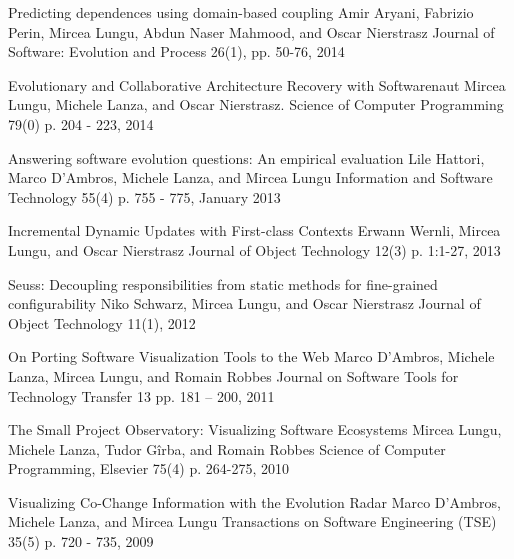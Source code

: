 
\begin{enumerate}

\paper
	{Predicting dependences using domain-based coupling}
	{Amir Aryani, Fabrizio Perin, Mircea Lungu, Abdun Naser Mahmood, and Oscar Nierstrasz}
	{Journal of Software: Evolution and Process 26(1), pp. 50-76, 2014}

\paper 
	{Evolutionary and Collaborative Architecture Recovery with Softwarenaut}
	{Mircea Lungu, Michele Lanza, and Oscar Nierstrasz.}
	{Science of Computer Programming 79(0) p. 204 - 223, 2014}

\paper 
	{Answering software evolution questions: An empirical evaluation}
	{Lile Hattori, Marco D'Ambros, Michele Lanza, and Mircea Lungu}
	{Information and Software Technology 55(4) p. 755 - 775, January 2013}

\paper 
	{Incremental Dynamic Updates with First-class Contexts}
	{Erwann Wernli, Mircea Lungu, and Oscar Nierstrasz}
	{Journal of Object Technology 12(3) p. 1:1-27, 2013}

\paper
	{Seuss: Decoupling responsibilities from static methods for fine-grained configurability}
	{Niko Schwarz, Mircea Lungu, and Oscar Nierstrasz}
	{Journal of Object Technology 11(1), 2012}

\paper 
	{On Porting Software Visualization Tools to the Web}
	{Marco D'Ambros, Michele Lanza, Mircea Lungu, and Romain Robbes}
	{Journal on Software Tools for Technology Transfer 13 pp. 181 -- 200, 2011}

\paper 
	{The Small Project Observatory: Visualizing Software Ecosystems}
	{Mircea Lungu, Michele Lanza, Tudor G\^irba, and Romain Robbes}
	{Science of Computer Programming, Elsevier 75(4) p. 264-275, 2010}

\paper 
	{Visualizing Co-Change Information with the Evolution Radar}
	{Marco D'Ambros, Michele Lanza, and Mircea Lungu}
	{Transactions on Software Engineering (TSE) 35(5) p. 720 - 735, 2009}

\end{enumerate}




